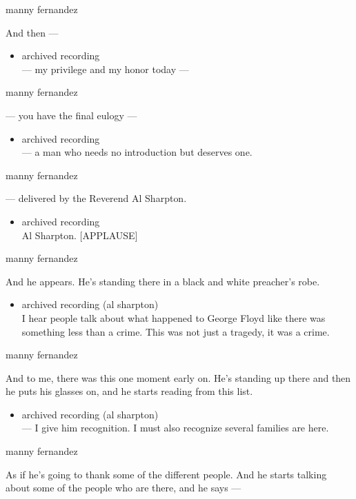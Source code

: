 manny fernandez

And then ---

\begin{itemize}
\tightlist
\item
  archived recording\\
  --- my privilege and my honor today ---
\end{itemize}

manny fernandez

--- you have the final eulogy ---

\begin{itemize}
\tightlist
\item
  archived recording\\
  --- a man who needs no introduction but deserves one.
\end{itemize}

manny fernandez

--- delivered by the Reverend Al Sharpton.

\begin{itemize}
\tightlist
\item
  archived recording\\
  Al Sharpton. {[}APPLAUSE{]}
\end{itemize}

manny fernandez

And he appears. He's standing there in a black and white preacher's
robe.

\begin{itemize}
\tightlist
\item
  archived recording (al sharpton)\\
  I hear people talk about what happened to George Floyd like there was
  something less than a crime. This was not just a tragedy, it was a
  crime.
\end{itemize}

manny fernandez

And to me, there was this one moment early on. He's standing up there
and then he puts his glasses on, and he starts reading from this list.

\begin{itemize}
\tightlist
\item
  archived recording (al sharpton)\\
  --- I give him recognition. I must also recognize several families are
  here.
\end{itemize}

manny fernandez

As if he's going to thank some of the different people. And he starts
talking about some of the people who are there, and he says ---


